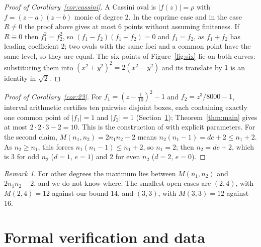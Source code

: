 \documentclass[11pt]{amsart}
\theoremstyle{remark}\newtheorem{remark}[theorem]{Remark}
\theoremstyle{definition}\newtheorem{example}[theorem]{Example}
\begin{document}
\begin{proof}[Proof of Corollary~\ref{cor:cassini}]
A Cassini oval is $|f(z)|=\rho$ with $f=(z-a)(z-b)$ monic of degree $2$. In the coprime case and in the case
$R\ne0$ the proof above gives at most $6$ points without assuming finiteness. If $R\equiv0$ then $f_1^2=f_2^2$, so
$(f_1-f_2)(f_1+f_2)=0$ and $f_1=f_2$, as $f_1+f_2$ has leading coefficient $2$; two ovals with the same foci and a
common point have the same level, so they are equal. The six points of Figure~\ref{fig:six} lie on both curves:
substituting them into $(x^2+y^2)^2=2(x^2-y^2)$ and its translate by $1$ is an identity in $\sqrt2$.
\end{proof}

\begin{proof}[Proof of Corollary~\ref{cor:23}]
For $f_1=(z-\tfrac1{10})^2-1$ and $f_2=z^3/8000-1$, interval arithmetic certifies ten pairwise disjoint boxes, each
containing exactly one common point of $|f_1|=1$ and $|f_2|=1$ (Section~\ref{sec:lean}); Theorem~\ref{thm:main} gives
at most $2\cdot2\cdot3-2=10$. This is the construction of \cite[Proposition~2]{op} with explicit parameters. For the
second claim, $M(n_1,n_2)=2n_1n_2-2$ means $n_2(n_1-1)=de+2\le n_1+2$. As $n_2\ge n_1$, this forces
$n_1(n_1-1)\le n_1+2$, so $n_1=2$; then $n_2=de+2$, which is $3$ for odd $n_2$ ($d=1$, $e=1$) and $2$ for even $n_2$
($d=2$, $e=0$).
\end{proof}

\begin{remark}
For other degrees the maximum lies between $M(n_1,n_2)$ and $2n_1n_2-2$, and we do not know where. The smallest open
cases are $(2,4)$, with $M(2,4)=12$ against our bound $14$, and $(3,3)$, with $M(3,3)=12$ against $16$.
\end{remark}

\section{Formal verification and data}\label{sec:lean}
\end{document}
